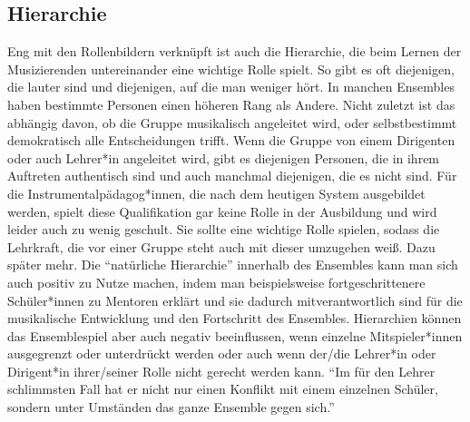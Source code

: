 \subsection{Hierarchie}
Eng mit den Rollenbildern verknüpft ist auch die Hierarchie, die beim Lernen der
Musizierenden untereinander eine wichtige Rolle spielt. So gibt es oft
diejenigen, die lauter sind und diejenigen, auf die man weniger hört. In
manchen Ensembles haben bestimmte Personen einen höheren Rang als Andere. Nicht
zuletzt ist das abhängig davon, ob die Gruppe musikalisch angeleitet wird, oder
selbstbestimmt demokratisch alle Entscheidungen trifft. Wenn die Gruppe von
einem Dirigenten oder auch Lehrer*in angeleitet wird, gibt es diejenigen
Personen, die in ihrem Auftreten authentisch sind und auch manchmal
diejenigen, die es nicht sind. Für die Instrumentalpädagog*innen, die nach dem
heutigen System ausgebildet werden, spielt diese Qualifikation gar keine Rolle
in der Ausbildung
und wird leider auch zu wenig geschult. Sie sollte eine wichtige Rolle spielen,
sodass die Lehrkraft, die vor einer Gruppe steht auch mit dieser umzugehen
weiß. Dazu später mehr. Die \enquote{natürliche Hierarchie} innerhalb des
Ensembles kann man sich auch positiv zu Nutze machen, indem man beispielsweise
fortgeschrittenere Schüler*innen zu Mentoren erklärt und sie dadurch mitverantwortlich
sind für die musikalische Entwicklung und den Fortschritt des
Ensembles.\autocite[95]{doerne:umfassend_musizieren} Hierarchien können das
Ensemblespiel aber auch negativ beeinflussen, wenn einzelne Mitspieler*innen
ausgegrenzt oder unterdrückt werden oder auch wenn der/die Lehrer*in oder
Dirigent*in ihrer/seiner Rolle nicht gerecht werden kann. \enquote{Im für den Lehrer
schlimmsten Fall hat er nicht nur einen Konflikt mit einem einzelnen Schüler,
sondern unter Umständen das ganze Ensemble gegen
sich.}\autocite[94]{mitzscherlich:musikpsychologie}


